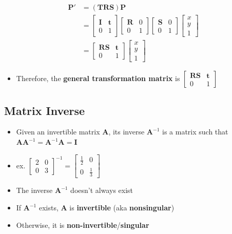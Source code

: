 \documentclass[letterpaper,12pt]{article}
\newcommand{\vect}[1]{\mathbf{#1}}
\newcommand{\matr}[1]{\mathbf{#1}}
\begin{document}
\begin{align}
 \vect{P}' & = (\matr{T}\matr{R}\matr{S}) \vect{P} \\
           & = \begin{bmatrix}
  \matr{I} & \vect{t} \\
  0        & 1
 \end{bmatrix}
 \begin{bmatrix}
  \matr{R} & 0 \\
  0        & 1
 \end{bmatrix}
 \begin{bmatrix}
  \matr{S} & 0 \\
  0        & 1
 \end{bmatrix}
 \begin{bmatrix}
  x \\
  y \\
  1
 \end{bmatrix}                       \\
           & = \begin{bmatrix}
  \matr{R}\matr{S} & \vect{t} \\
  0                & 1
 \end{bmatrix}
 \begin{bmatrix}
  x \\
  y \\
  1
 \end{bmatrix}
\end{align}

\begin{itemize}
 \item Therefore, the \textbf{general transformation matrix} is
       $\begin{bmatrix}
         \matr{R}\matr{S} & \vect{t} \\
         0                & 1
        \end{bmatrix}$
\end{itemize}

\subsection{Matrix Inverse}
\begin{itemize}
 \item Given an invertible matrix $\matr{A}$, its inverse $\matr{A}^{-1}$ is a matrix such that $\matr{A}\matr{A}^{-1} = \matr{A}^{-1}\matr{A} = \matr{I}$
 \item ex. $
        \begin{bmatrix}
         2 & 0 \\
         0 & 3
        \end{bmatrix}^{-1}
        =\begin{bmatrix}
         \frac{1}{2} & 0           \\
         0           & \frac{1}{3}
        \end{bmatrix}$
 \item The inverse $\matr{A}^{-1}$ doesn't always exist
 \item If $\matr{A}^{-1}$ exists, $\matr{A}$ is \textbf{invertible} (aka \textbf{nonsingular})
 \item Otherwise, it is \textbf{non-invertible}/\textbf{singular}
\end{itemize}
\end{document}
